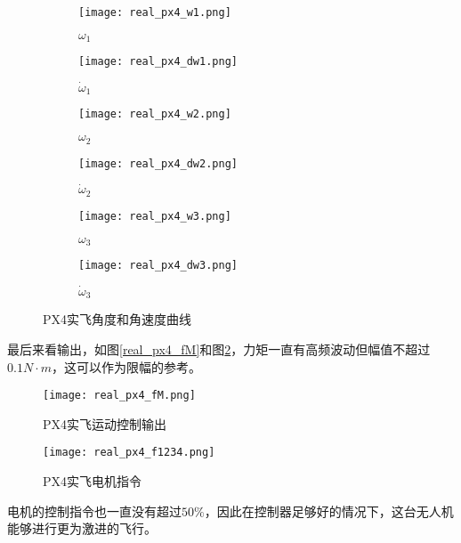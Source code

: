 \begin{figure}[!h]
  \centering
  \begin{subfigure}[b]{0.49\textwidth}
      \centering
      \texttt{[image: real\_px4\_w1.png]}
      \caption{$\omega_1$}
  \end{subfigure}
  \hfill
  \begin{subfigure}[b]{0.49\textwidth}
      \centering
      \texttt{[image: real\_px4\_dw1.png]}
      \caption{$\dot \omega_1$}
  \end{subfigure}
  
  \begin{subfigure}[b]{0.49\textwidth}
      \centering
      \texttt{[image: real\_px4\_w2.png]}
      \caption{$\omega_2$}
  \end{subfigure}
  \hfill
  \begin{subfigure}[b]{0.49\textwidth}
      \centering
      \texttt{[image: real\_px4\_dw2.png]}
      \caption{$\dot \omega_2$}
  \end{subfigure}
  
  \begin{subfigure}[b]{0.49\textwidth}
      \centering
      \texttt{[image: real\_px4\_w3.png]}
      \caption{$\omega_3$}
  \end{subfigure}
  \hfill
  \begin{subfigure}[b]{0.49\textwidth}
      \centering
      \texttt{[image: real\_px4\_dw3.png]}
      \caption{$\dot \omega_3$}
  \end{subfigure}
  \caption{PX4实飞角度和角速度曲线}
  \label{real_px4_wdw}
\end{figure}

最后来看输出，如图\ref{real_px4_fM}和图\ref{real_px4_f1234}，力矩一直有高频波动但幅值不超过$0.1N\cdot m$，这可以作为限幅的参考。
\begin{figure}[!h]
  \centering
  \begin{minipage}[b]{0.49\linewidth}
      \texttt{[image: real\_px4\_fM.png]}
      \caption{PX4实飞运动控制输出}
      \label{real_px4_fM}
  \end{minipage}
  \hfill %
  \begin{minipage}[b]{0.49\linewidth}
      \texttt{[image: real\_px4\_f1234.png]}
      \caption{PX4实飞电机指令}
      \label{real_px4_f1234}
  \end{minipage}
\end{figure}
电机的控制指令也一直没有超过$50\%$，因此在控制器足够好的情况下，这台无人机能够进行更为激进的飞行。

